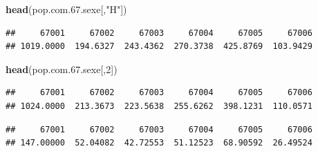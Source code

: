 \documentclass[]{article}
\newenvironment{Shaded}{\begin{snugshade}}{\end{snugshade}}
\newcommand{\KeywordTok}[1]{\textcolor[rgb]{0.13,0.29,0.53}{\textbf{{#1}}}}
\newcommand{\DecValTok}[1]{\textcolor[rgb]{0.00,0.00,0.81}{{#1}}}
\newcommand{\FloatTok}[1]{\textcolor[rgb]{0.00,0.00,0.81}{{#1}}}
\newcommand{\StringTok}[1]{\textcolor[rgb]{0.31,0.60,0.02}{{#1}}}
\newcommand{\CommentTok}[1]{\textcolor[rgb]{0.56,0.35,0.01}{\textit{{#1}}}}
\newcommand{\NormalTok}[1]{{#1}}
\begin{document}
\begin{Shaded}
\begin{Highlighting}[]
\KeywordTok{head}\NormalTok{(pop.com}\FloatTok{.67}\NormalTok{.sexe[,}\StringTok{"H"}\NormalTok{])}
\end{Highlighting}
\end{Shaded}

\begin{verbatim}
##     67001     67002     67003     67004     67005     67006 
## 1019.0000  194.6327  243.4362  270.3738  425.8769  103.9429
\end{verbatim}

\begin{Shaded}
\begin{Highlighting}[]
\KeywordTok{head}\NormalTok{(pop.com}\FloatTok{.67}\NormalTok{.sexe[,}\DecValTok{2}\NormalTok{])}
\end{Highlighting}
\end{Shaded}

\begin{verbatim}
##     67001     67002     67003     67004     67005     67006 
## 1024.0000  213.3673  223.5638  255.6262  398.1231  110.0571
\end{verbatim}

\begin{Shaded}
\end{Shaded}

\begin{verbatim}
##     67001     67002     67003     67004     67005     67006 
## 147.00000  52.04082  42.72553  51.12523  68.90592  26.49524
\end{verbatim}

\begin{Shaded}
\end{Shaded}
\end{document}
